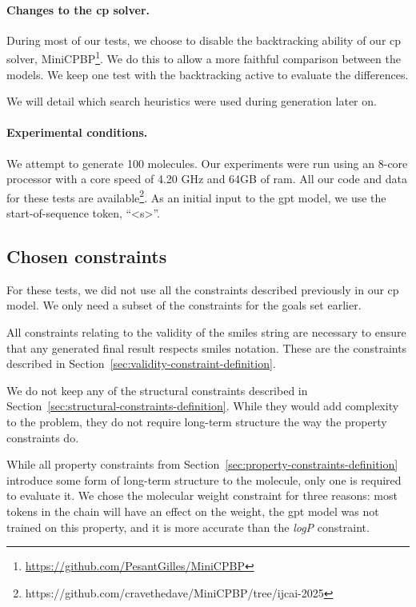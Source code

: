 \documentclass[../Document.tex]{subfiles}
\begin{document}
\paragraph{Changes to the \gls{cp} solver.}
During most of our tests, we choose to disable the backtracking ability of our \gls{cp} solver, MiniCPBP\footnote{\url{https://github.com/PesantGilles/MiniCPBP}}.
We do this to allow a more faithful comparison between the models.
We keep one test with the backtracking active to evaluate the differences.

We will detail which search heuristics were used during generation later on.

\paragraph{Experimental conditions.}
We attempt to generate 100 molecules.
Our experiments were run using an 8-core processor with a core speed of 4.20 GHz and 64GB of \gls{ram}.
All our code and data for these tests are available\footnote{https://github.com/cravethedave/MiniCPBP/tree/ijcai-2025}.
As an initial input to the \gls{gpt} model, we use the start-of-sequence token, ``<s>''.

\subsection{Chosen constraints}
For these tests, we did not use all the constraints described previously in our \gls{cp} model.
We only need a subset of the constraints for the goals set earlier.

All constraints relating to the validity of the \gls{smiles} string are necessary to ensure that any generated final result respects \gls{smiles} notation. These are the constraints described in Section~\ref{sec:validity-constraint-definition}.

We do not keep any of the structural constraints described in Section~\ref{sec:structural-constraints-definition}. While they would add complexity to the problem, they do not require long-term structure the way the property constraints do.

While all property constraints from Section~\ref{sec:property-constraints-definition} introduce some form of long-term structure to the molecule, only one is required to evaluate it. We chose the molecular weight constraint for three reasons: most tokens in the chain will have an effect on the weight, the \gls{gpt} model was not trained on this property, and it is more accurate than the \emph{logP} constraint.
\end{document}
